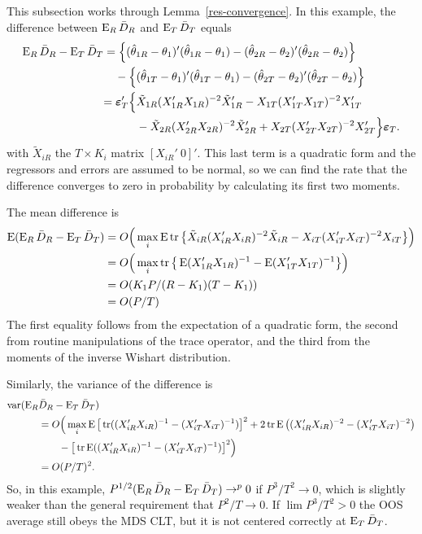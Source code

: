 \documentclass[12pt]{article}
\begin{document}
This subsection works through Lemma~\ref{res-convergence}. In this
example, the difference between $\operatorname{E}_R \bar{D}_{R}$ and $\operatorname{E}_T \bar{D}_{T}$ equals
\begin{equation*}
  \begin{split}
    \operatorname{E}_R \bar{D}_{R} - \operatorname{E}_T \bar{D}_{T} &= \Big\{(\hat\theta_{1R} - \theta_1)'(\hat\theta_{1R} -
    \theta_1) -
    (\hat\theta_{2R} - \theta_2)'(\hat\theta_{2R} - \theta_2)\Big\} \\
    & \quad - \Big\{(\hat\theta_{1T} - \theta_1)'(\hat\theta_{1T} - \theta_1) -
    (\hat\theta_{2T} - \theta_2)'(\hat\theta_{2T} - \theta_2)\Big\} \\
    &\begin{split}
      =\boldsymbol{\varepsilon}_{T}'\Big\{
      & \tilde{X}_{1R}(X_{1R}'X_{1R})^{-2} \tilde{X}_{1R}'
      - X_{1T}(X_{1T}'X_{1T})^{-2} X_{1T}' \\
      & - \tilde{X}_{2R}(X_{2R}'X_{2R})^{-2} \tilde{X}_{2R}'
      + X_{2T}(X_{2T}'X_{2T})^{-2} X_{2T}'
      \Big\}\boldsymbol{\varepsilon}_{T}.
    \end{split}
  \end{split}
\end{equation*}
with $\tilde{X}_{iR}$ the $T \times K_i$ matrix $[X_{iR}'\ 0]'$. This
last term is a quadratic form and the regressors and errors are
assumed to be normal, so we can find the rate that the difference
converges to zero in probability by calculating its first two moments.

The mean difference is
\begin{equation*}
  \begin{split}
  \operatorname{E}(\operatorname{E}_R \bar{D}_{R} - \operatorname{E}_T \bar{D}_{T})
      &=O\Big(\max_i \operatorname{E} \operatorname{tr} \big\{
        \tilde{X}_{iR}(X_{iR}'X_{iR})^{-2} \tilde{X}_{iR}
        - X_{iT}(X_{iT}'X_{iT})^{-2} X_{iT} \big\} \Big) \\
      &=O\Big(\max_i \operatorname{tr} \big\{\operatorname{E} (X_{1R}'X_{1R})^{-1}
         - \operatorname{E} (X_{1T}'X_{1T})^{-1} \big\}\Big) \\
      &=O( K_1 P / (R-K_1)(T-K_1)) \\
      &=O(P/T)
    \end{split}
\end{equation*}
The first equality follows from the expectation of a quadratic form,
the second from routine manipulations of the trace operator, and the
third from the moments of the inverse Wishart distribution.

Similarly, the variance of the difference is
\begin{align*}
  \operatorname{var}(\operatorname{E}_R & \bar{D}_{R} - \operatorname{E}_T \bar{D}_{T}) \\ &=
  O\Big(\max_i \operatorname{E}\big[\operatorname{tr}((X_{iR}'X_{iR})^{-1} - (X_{iT}'X_{iT})^{-1})\big]^2
  + 2 \operatorname{tr} \operatorname{E}\big((X_{iR}'X_{iR})^{-2} - (X_{iT}'X_{iT})^{-2}\big) \\
  &\qquad - \big[\operatorname{tr} \operatorname{E}((X_{iR}'X_{iR})^{-1} - (X_{iT}'X_{iT})^{-1}) \big]^2 \Big)\\
  &= O(P/T)^2.
\end{align*}
So, in this example, $P^{1/2}(\operatorname{E}_R \bar{D}_{R} - \operatorname{E}_T \bar{D}_{T}) \to^p 0$
if $P^3/T^2 \to 0$, which is slightly weaker than the general
requirement that $P^2/T \to 0$.  If $\lim P^3/T^2 > 0$ the OOS average
still obeys the MDS CLT, but it is not centered correctly at $\operatorname{E}_T
\bar{D}_{T}$.
\end{document}
